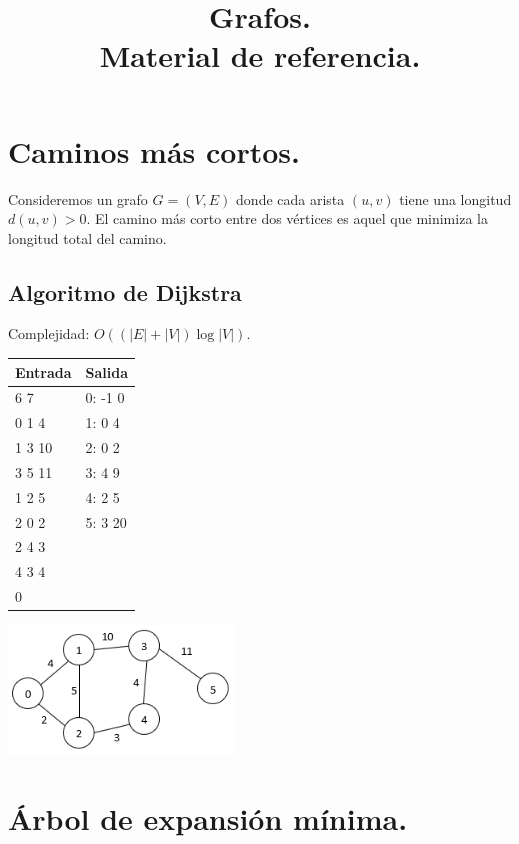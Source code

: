 \documentclass[12pt, letterpaper, twoside]{article}
\title{Grafos.\\
	  \large Material de referencia.}
\author{}
\date{}
\begin{document}
\maketitle

\tableofcontents

\newpage

\section{Caminos más cortos.}

Consideremos un grafo $G = (V, E)$ donde cada arista $(u, v)$ tiene una longitud $d(u,v) > 0$. El camino más corto entre dos vértices es aquel que minimiza la longitud total del camino.

\subsection{Algoritmo de Dijkstra}

Complejidad: $O((|E| + |V|) \log|V|)$.

 \medskip

\begin{tabular}{|p{7cm}|p{7cm}|}
\hline
\textbf{Entrada} & \textbf{Salida}\\ \hline
6 7    & 0: -1 0\\
0 1 4  & 1: 0 4\\
1 3 10 & 2: 0 2\\
3 5 11 & 3: 4 9\\
1 2 5  & 4: 2 5\\
2 0 2  & 5: 3 20\\
2 4 3  & \\
4 3 4  & \\
0      & \\ \hline
\end{tabular}

\begin{center}
\includegraphics[width = 0.45\textwidth]{ShortestPath.png}
\end{center}

\newpage

\section{Árbol de expansión mínima.}
\end{document}
